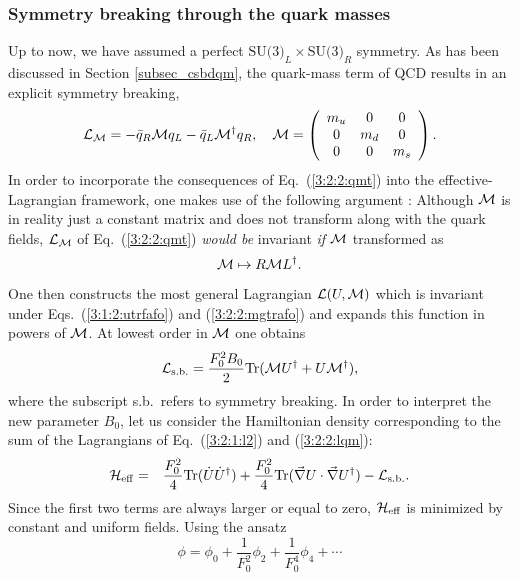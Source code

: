 \documentclass[twoside,12pt]{article}
\begin{document}
\subsubsection{Symmetry breaking through the quark masses}
    Up to now, we have assumed a perfect
$\mbox{SU(3)}_L\times\mbox{SU(3)}_R$ symmetry.
   As has been discussed in Section \ref{subsec_csbdqm},
the quark-mass term of QCD results
in an explicit symmetry breaking,
\begin{equation}
\label{3:2:2:qmt}
{\cal L}_{\cal M}=-\bar{q}_R{\cal M} q_L-\bar{q}_L {\cal M}^\dagger q_R,\quad
{\cal M}=\left(\begin{array}{ccc}m_u&0&0\\0&m_d&0\\0&0&m_s\end{array}\right).
\end{equation}
   In order to incorporate the consequences of Eq.\ (\ref{3:2:2:qmt})
into the effective-Lagrangian framework, one makes use of the
following argument \cite{Georgi}:
   Although ${\cal M}$ is in reality just a constant matrix and does not
transform along with the quark fields, ${\cal L}_{\cal M}$ of Eq.\ (\ref{3:2:2:qmt})
{\em would be} invariant {\em if} ${\cal M}$ transformed as
\begin{equation}
\label{3:2:2:mgtrafo}
{\cal M}\mapsto R {\cal M} L^\dagger.
\end{equation}
   One then constructs the most general Lagrangian ${\cal L}(U,{\cal M})$ which is
invariant under Eqs.\ (\ref{3:1:2:utrfafo}) and
(\ref{3:2:2:mgtrafo}) and expands this function in powers of ${\cal M}$.
   At lowest order in ${\cal M}$ one obtains
\begin{equation}
\label{3:2:2:lqm}
{\cal L}_{\rm s.b.}=\frac{F^2_0 B_0}{2}\mbox{Tr}({\cal M}U^\dagger+U{\cal M}^\dagger),
\end{equation}
   where the subscript s.b.\ refers to symmetry breaking.
   In order to interpret the new parameter $B_0$, let us consider the Hamiltonian
density corresponding to the sum of the Lagrangians of Eq.~(\ref{3:2:1:l2}) and (\ref{3:2:2:lqm}):
\begin{eqnarray*}
{\cal H}_{\rm eff}
&=&\frac{F_0^2}{4}\mbox{Tr}(\dot U \dot U^\dagger)
+\frac{F_0^2}{4}\mbox{Tr}(\vec{\nabla}U\cdot\vec{\nabla}U^\dagger)
-{\cal L}_{\rm s.b.}.
\end{eqnarray*}
   Since the first two terms are always larger or equal to zero,
${\cal H}_{\rm eff}$ is minimized by constant and uniform fields.
   Using the ansatz
\begin{displaymath}
\phi=\phi_0+\frac{1}{F_0^2}\phi_2+\frac{1}{F_0^4}\phi_4+\cdots
\end{displaymath}
\end{document}
